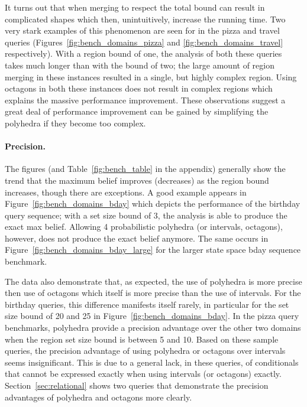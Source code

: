 It turns out that when merging to respect the total bound can result
in complicated shapes which then, unintuitively, increase the running
time.  Two very stark examples of this phenomenon are seen for in the
pizza and travel queries (Figures~\ref{fig:bench_domains_pizza} and
\ref{fig:bench_domains_travel} respectively). With a region bound of
one, the analysis of both these queries takes much longer than with
the bound of two; the large amount of region merging in these
instances resulted in a single, but highly complex region. Using
octagons in both these instances does not result in complex regions
which explains the massive performance improvement. These
observations suggest a great deal of performance improvement can be
gained by simplifying the polyhedra if they become too complex.



\paragraph*{Precision.} The figures (and Table~\ref{fig:bench_table}
in the appendix) generally show the trend that the maximum belief
improves (decreases) as the region bound increases, though there are
exceptions.  A good example appears in
Figure~\ref{fig:bench_domains_bday} which depicts the performance of
the birthday query sequence; with a set size bound of 3, the analysis
is able to produce the exact max belief.  Allowing 4 probabilistic
polyhedra (or intervals, octagons), however, does not produce the
exact belief anymore. The same occurs in
Figure~\ref{fig:bench_domains_bday_large} for the larger state space
bday sequence benchmark.

The data also demonstrate that, as expected, the use of polyhedra is
more precise then use of octagons which itself is more precise than
the use of intervals. For the birthday queries, this difference
manifests itself rarely, in particular for the set size bound of 20
and 25 in Figure~\ref{fig:bench_domains_bday}. In the pizza query
benchmarks, polyhedra provide a precision advantage over the other two
domains when the region set size bound is between 5 and 10.  Based on
these sample queries, the precision advantage of using polyhedra or
octagons over intervals seems insignificant. This is due to a general
lack, in these queries, of conditionals that cannot be expressed
exactly when using intervals (or octagons) exactly.
Section~\ref{sec:relational} shows two queries that demonstrate the precision
advantages of polyhedra and octagons more clearly.

